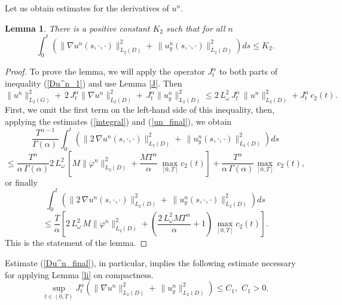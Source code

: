 \documentclass[12pt]{amsart}
\newtheorem{lem}[thm]{Lemma}
\theoremstyle{definition}
\numberwithin{equation}{section}
\begin{document}
Let us obtain estimates for the derivatives of $u^n$. 
\begin{lem}\label{nablaestimate} There is a positive constant $K_2$ such that for all $n$
\begin{equation}\label{un_nablaestimate}
 \int_0^t \left(\|  \nabla u^n (s, \cdot, \cdot)\|_{L_2(D)}^2 +  \, \| u^n_y (s, \cdot, \cdot) \|_{L_2(D)}^2 \right) ds\leq K_2.     
 \end{equation}
\end{lem}
\begin{proof}

To prove the lemma, we will apply the operator $J_t^\alpha$ to both parts of inequality (\ref{Du^n_1}) and use Lemma \ref{J}. Then
\begin{equation}\label{Du^n_final}
\| u^n \|_{L_2(G)}^2 + \, 2\, J_t^\alpha \| \nabla u^n \|_{L_2(D)}^2 +  \, J_t^\alpha \| u^n_y \|_{L_2(D)}^2 \leq 2\,L_\omega^2\,J_t^\alpha\, \| u^n \|_{L_2(D)}^2 +J_t^\alpha\, c_2(t).
\end{equation}
First, we omit the first term on the left-hand side of this inequality, then, applying the estimates (\ref{integral}) and (\ref{un_final}), we obtain
\[
\frac{T^{\alpha -1 }}{\Gamma(\alpha)\, }\int_0^t \left(\| 2 \, \nabla u^n (s, \cdot, \cdot)\|_{L_2(D)}^2 +  \, \| u^n_y (s, \cdot, \cdot) \|_{L_2(D)}^2 \right) ds 
\]
\[
\leq 
 \frac{T^\alpha}{\alpha\, \Gamma (\alpha)}2\,L_\omega^2\,\left[M\| \varphi^n \|_{L_2(D)}^2  + \frac{MT^\alpha}{\alpha} \,\max_{[0,T]}c_{2}(t) \right] + \frac{T^\alpha}{\alpha\, \Gamma (\alpha)} \max_{[0,T]}\, c_2(t),
 \]
 or finally
\begin{equation}\label{u_y}
 \int_0^t \left(\| 2 \, \nabla u^n (s, \cdot, \cdot)\|_{L_2(D)}^2 +  \, \| u^n_y (s, \cdot, \cdot) \|_{L_2(D)}^2 \right) ds     
 \end{equation}
\[
\leq 
 \frac{T}{\alpha}\left[2\,L_\omega^2\,M\| \varphi^n \|_{L_2(D)}^2  + \left(\frac{2\,L_\omega^2MT^\alpha}{\alpha} +1\right)\,\max_{[0,T]}c_{2}(t) \right]. 
 \]
 This is the statement of the lemma.
\end{proof}
Estimate (\ref{Du^n_final}), in particular, implies the following estimate necessary for applying Lemma \ref{li} on compactness.
\begin{equation}\label{estimateLi}
    \sup\limits_{t\in (0, T)}  J_t^\alpha(\| \nabla u^n \|_{L_2(D)}^2 +  \, \| u^n_y \|_{L_2(D)}^2) \leq C_1,\,\, C_1 >0.
\end{equation}
\end{document}
